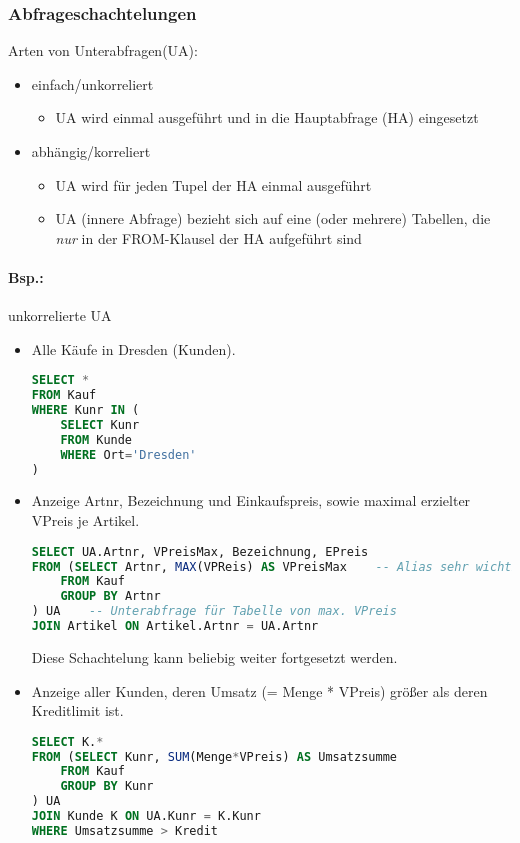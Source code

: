\subsubsection{Abfrageschachtelungen}
Arten von Unterabfragen(UA):
\begin{itemize}
\item einfach/unkorreliert
\begin{itemize}
\item UA wird einmal ausgeführt und in die Hauptabfrage (HA) eingesetzt
\end{itemize}
\item abhängig/korreliert
\begin{itemize}
\item UA wird für jeden Tupel der HA einmal ausgeführt
\item UA (innere Abfrage) bezieht sich auf eine (oder mehrere) Tabellen, die \emph{nur} in der FROM-Klausel der HA aufgeführt sind
\end{itemize}
\end{itemize}
\paragraph{Bsp.:} unkorrelierte UA
\begin{itemize}
\item Alle Käufe in Dresden (Kunden).
\begin{lstlisting}[language=SQL]
SELECT *
FROM Kauf
WHERE Kunr IN (
	SELECT Kunr
	FROM Kunde
	WHERE Ort='Dresden'
)
\end{lstlisting}
\item Anzeige Artnr, Bezeichnung und Einkaufspreis, sowie maximal erzielter VPreis je Artikel.
\begin{lstlisting}[language=SQL]
SELECT UA.Artnr, VPreisMax, Bezeichnung, EPreis
FROM (SELECT Artnr, MAX(VPReis) AS VPreisMax	-- Alias sehr wichtig, damit Spalte in HA wieder verwendet werden kann!
	FROM Kauf
	GROUP BY Artnr
) UA	-- Unterabfrage für Tabelle von max. VPreis
JOIN Artikel ON Artikel.Artnr = UA.Artnr
\end{lstlisting}
Diese Schachtelung kann beliebig weiter fortgesetzt werden.
\item Anzeige aller Kunden, deren Umsatz (= Menge * VPreis) größer als deren Kreditlimit ist.
\begin{lstlisting}[language=SQL]
SELECT K.*
FROM (SELECT Kunr, SUM(Menge*VPreis) AS Umsatzsumme
	FROM Kauf
	GROUP BY Kunr
) UA
JOIN Kunde K ON UA.Kunr = K.Kunr
WHERE Umsatzsumme > Kredit
\end{lstlisting}
\end{itemize}
